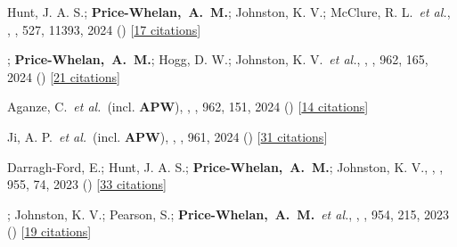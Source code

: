 \item[{\color{deemph}\scriptsize124}]Hunt, J. A. S.; \textbf{Price-Whelan,~A.~M.}; Johnston, K. V.; McClure, R. L.~\textit{et al.}, , \mnras, 527, 11393, 2024 () [\href{http://adsabs.harvard.edu/abs/2024MNRAS.52711393H}{17 citations}]

\item[{\color{deemph}\scriptsize123}]; \textbf{Price-Whelan,~A.~M.}; Hogg, D. W.; Johnston, K. V.~\textit{et al.}, , \apj, 962, 165, 2024 () [\href{http://adsabs.harvard.edu/abs/2024ApJ...962..165H}{21 citations}]

\item[{\color{deemph}\scriptsize122}]Aganze, C.~\textit{et al.}~(incl. \textbf{APW}), , \apj, 962, 151, 2024 () [\href{http://adsabs.harvard.edu/abs/2024ApJ...962..151A}{14 citations}]

\item[{\color{deemph}\scriptsize121}]Ji, A. P.~\textit{et al.}~(incl. \textbf{APW}), , \apj, 961, 2024 () [\href{http://adsabs.harvard.edu/abs/2024ApJ...961L..41J}{31 citations}]

\item[{\color{deemph}\scriptsize120}]Darragh-Ford, E.; Hunt, J. A. S.; \textbf{Price-Whelan,~A.~M.}; Johnston, K. V., , \apj, 955, 74, 2023 () [\href{http://adsabs.harvard.edu/abs/2023ApJ...955...74D}{33 citations}]

\item[{\color{deemph}\scriptsize119}]; Johnston, K. V.; Pearson, S.; \textbf{Price-Whelan,~A.~M.}~\textit{et al.}, , \apj, 954, 215, 2023 () [\href{http://adsabs.harvard.edu/abs/2023ApJ...954..215Y}{19 citations}]

